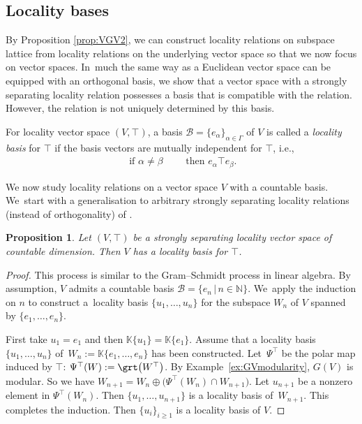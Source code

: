 \documentclass[10pt,a4paper]{amsart}
\numberwithin{equation}{section}
\newtheorem{Proposition}[Theorem]{Proposition}
\newcommand{\K}{\mathbb{K}}
\newcommand{\N}{\mathbb{N}}
\newcommand{\loc}{locality\xspace}
\newcommand{\pone}{separating\xspace }
\begin{document}
\subsection{Locality bases}
By Proposition \ref{prop:VGV2}, we can construct locality relations on subspace lattice from locality relations on the underlying vector space so that we now focus on vector spaces. In~much the same way as a Euclidean vector space can be equipped with an orthogonal basis, we show that a vector space with a strongly
\pone \loc relation possesses a basis that is compatible with the relation. However, the relation is not uniquely determined by this basis.

\begin{Definition} \label{defn:compl_map_TVS}
For locality vector space $(V, \top)$, a basis ${\mathcal B}=\{e_\alpha \}_{\alpha \in \Gamma} $ of $V$ is called a {\it \loc basis} for $\top$ if the basis vectors are mutually independent for $\top$, i.e.,
\begin{gather*}%
\text{ if } \alpha \neq \beta \qquad \text{ then } e_\alpha \top e_\beta.
\end{gather*}
\end{Definition}

We now study \loc relations on a vector space $V$ with a countable basis. We~start with a generalisation to arbitrary strongly separating locality relations (instead of orthogonality) of \cite[Chapter II, Theorem 1]{Gross79}.
\begin{Proposition}\label{prop:Psisplitting}	
Let $(V, \top) $ be a strongly \pone \loc vector space of countable dimension.
Then $V$ has a \loc basis for $\top$.
\end{Proposition}

\begin{proof} This process is similar to the Gram--Schmidt process in linear algebra. By assumption, $V$ admits a countable basis ${\mathcal B}=\{e_n\,|\, n\in \N\}$. We~apply the induction on $n$ to construct a~locality basis $\{u_1,\dots,u_n\}$ for the subspace $W_n$ of $V$ spanned by $\{e_1,\dots,e_n\}$.

First take $u_1=e_1$ and then $\K\{u_1\}=\K\{e_1\}$. Assume that a \loc basis $\{u_1,\dots,u_n\}$ of~$W_n:=\K\{e_1,\dots, e_n\}$ has been constructed.
Let~$\Psi^\top$ be the polar map
induced by $\top$: $\Psi^\top(W):=\grt\big(W^\top\big)$.
By Example~\ref{ex:GVmodularity}, $G(V)$ is modular. So we have
$W_{n+1}=W_n\oplus \big(\Psi^\top(W_n)\cap W_{n+1}\big)$. Let $u_{n+1}$ be a nonzero element in $\Psi^\top(W_n)$. Then $\{u_1,\dots,u_{n+1}\}$ is a locality basis of~$W_{n+1}$. This completes the induction. Then $\{u_i\}_{i\geq 1}$ is a \loc basis of $V$.
\end{proof}
\end{document}
